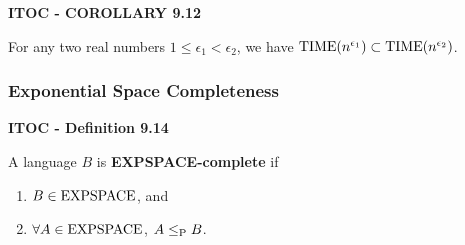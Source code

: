 \begin{shaded}
\textbf{ITOC - COROLLARY 9.12}

\medskip
For any two real numbers $1 \leq \epsilon_1 < \epsilon_2$, we have $\TIME(n^{\epsilon_1}) \subset \TIME(n^{\epsilon_2})$.
\end{shaded}

\subsubsection{Exponential Space Completeness}

\begin{shaded}
\textbf{ITOC - Definition 9.14}

\medskip
A language $B$ is \textbf{EXPSPACE-complete} if
\begin{enumerate}
\item $B \in \EXPSPACE$, and
\item $\forall A \in \EXPSPACE$, $A \leq_\P B$.
\end{enumerate}
\end{shaded}